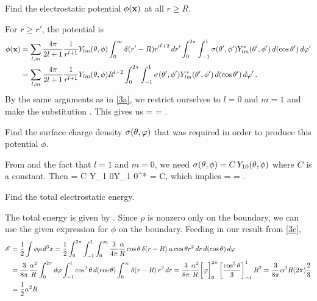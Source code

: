 \begin{problem} \label{3b}
	Find the electrostatic potential $\phi(\mathbf{x})$ at all $r \geq R$.
\end{problem}

\begin{solution}
	For $r \geq r'$, the potential is
	\begin{align*}
		\phi(\mathbf{x}) &= \sum_{l,m}\frac{4\pi}{2l + 1} \frac{1}{r^{l + 1}} Y_{l m}(\theta, \phi) \int_0^\infty \delta(r' - R) {r'}^{l+2} \dd{r'} \int_0^{2\pi} \int_{-1}^1 \sigma(\theta', \phi') Y_{l m}^*(\theta', \phi') \dd{(\cos\theta')} \dd{\varphi'} \\
		&= \sum_{l,m}\frac{4\pi}{2l + 1} \frac{1}{r^{l + 1}} Y_{l m}(\theta, \phi) R^{l+2} \int_0^{2\pi} \int_{-1}^1 \sigma(\theta', \phi') Y_{l m}^*(\theta', \phi') \dd{(\cos\theta')} \dd{\varphi'}.
	\end{align*}
	By the same arguments as in \ref{3a}, we restrict ourselves to $l = 0$ and $m = 1$ and make the substitution .  This gives us
	\beq
		\phix =    \cost {} 
		= \alp {} \cost.
	\eeq
\end{solution}
\vfix


\newcommand{\Er}{E_r}
\newcommand{\thh}{\boldsymbol{\hat{\tht}}}
\newcommand{\phh}{\boldsymbol{\hat{\vph}}}

\begin{problem} \label{3c}
	Find the surface charge density $\sigma(\theta, \varphi)$ that was required in order to produce this potential $\phi$.
\end{problem}

\begin{solution}
	From  and the fact that $l = 1$ and $m = 0$, we need $\sigma(\theta, \phi) = C \,Y_{1 0}(\theta, \phi)$ where $C$ is a constant.  Then
	\beq
		  = C \intotp \intono Y_{1 0}\tvp Y_{1 0}^*\tvp \dctp \dvp
		= C,
	\eeq
	which implies
	\beq
		\sig\tv =    \cost =   \cost.
	\eeq
\end{solution}
\vfix


\newcommand{\dr}{\dd{r}}
\newcommand{\dct}{\dd{(\cost)}}
\newcommand{\dph}{\dd{\vph}}

\begin{problem}
	Find the total electrostatic energy.
\end{problem}

\begin{solution}
	The total energy is given by .  Since $\rho$ is nonzero only on the boundary, we can use the given expression for $\phi$ on the boundary.  Feeding in our result from \ref{3c}, 
	\begin{align*}
		\sE &= \frac{1}{2} \int \phi \rho \dcx
		= \frac{1}{2} \intotp \intono \intoi \frac{3}{4\pi} \frac{\alp}{R} \cost \, \delta(r - R) \, \alp \cost r^2 \dr \dct \dph \\
		&= \frac{3}{8\pi} \frac{\alp^2}{R} \intotp \dph \intono \cos^2\tht \dct \intoi \delta(r - R) \, r^2 \dr
		= \frac{3}{8\pi} \frac{\alp^2}{R} \bigg[ \vph \bigg]_0^{2\pi} \left[ \frac{\cos^3\tht}{3} \right]_{-1}^1 R^2
		= \frac{3}{8\pi} \alp^2 R (2\pi) \frac{2}{3} \\
		&= \frac{1}{2} \alp^2 R.
	\end{align*}
\end{solution}
\vfix